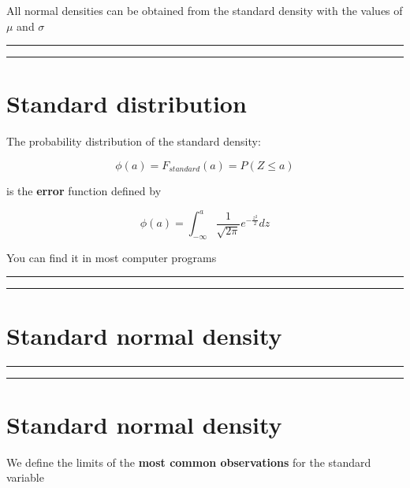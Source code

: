 \documentclass[
]{book}
\begin{document}
All normal densities can be obtained from the standard density with the values of \(\mu\) and \(\sigma\)

\begin{center}\rule{0.5\linewidth}{0.5pt}\end{center}

\begin{center}\rule{0.5\linewidth}{0.5pt}\end{center}

\hypertarget{standard-distribution}{%
\section{Standard distribution}\label{standard-distribution}}

The probability distribution of the standard density:

\[\phi(a)=F_{standard}(a)=P(Z \leq a)\]

is the \textbf{error} function defined by

\[\phi(a)=\int_{-\infty}^{a} \frac{1}{\sqrt{2\pi}}e^{-\frac{z^2}{2}} dz\]

You can find it in most computer programs

\begin{center}\rule{0.5\linewidth}{0.5pt}\end{center}

\begin{center}\rule{0.5\linewidth}{0.5pt}\end{center}

\hypertarget{standard-normal-density-3}{%
\section{Standard normal density}\label{standard-normal-density-3}}

\begin{center}\rule{0.5\linewidth}{0.5pt}\end{center}

\begin{center}\rule{0.5\linewidth}{0.5pt}\end{center}

\hypertarget{standard-normal-density-4}{%
\section{Standard normal density}\label{standard-normal-density-4}}

We define the limits of the \textbf{most common observations} for the standard variable
\end{document}
